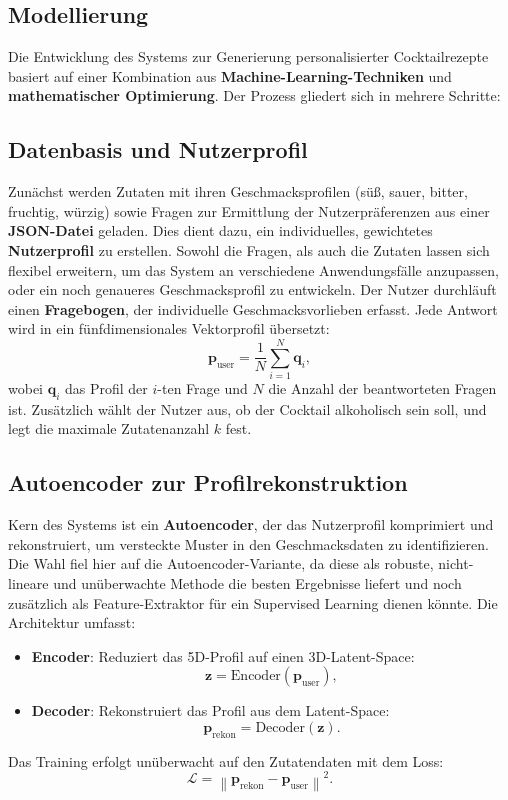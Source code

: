 \documentclass[12pt, a4paper]{report}
\begin{document}
\subsection{Modellierung}
Die Entwicklung des Systems zur Generierung personalisierter Cocktailrezepte basiert auf einer Kombination aus \textbf{Machine-Learning-Techniken} und \textbf{mathematischer Optimierung}. Der Prozess gliedert sich in mehrere Schritte:

\subsection*{Datenbasis und Nutzerprofil}
Zunächst werden Zutaten mit ihren Geschmacksprofilen (süß, sauer, bitter, fruchtig, würzig) sowie Fragen zur Ermittlung der Nutzerpräferenzen aus einer \textbf{JSON-Datei} geladen. Dies dient dazu, ein individuelles, gewichtetes \textbf{Nutzerprofil} zu erstellen. Sowohl die Fragen, als auch die Zutaten lassen sich flexibel erweitern, um das System an verschiedene Anwendungsfälle anzupassen, oder ein noch genaueres Geschmacksprofil zu entwickeln.
Der Nutzer durchläuft einen \textbf{Fragebogen}, der individuelle Geschmacksvorlieben erfasst. Jede Antwort wird in ein fünfdimensionales Vektorprofil übersetzt:
\[
\mathbf{p}_{\text{user}} = \frac{1}{N} \sum_{i=1}^N \mathbf{q}_i,
\]
wobei \( \mathbf{q}_i \) das Profil der \( i \)-ten Frage und \( N \) die Anzahl der beantworteten Fragen ist. Zusätzlich wählt der Nutzer aus, ob der Cocktail alkoholisch sein soll, und legt die maximale Zutatenanzahl \( k \) fest.

\subsection*{Autoencoder zur Profilrekonstruktion}
Kern des Systems ist ein \textbf{Autoencoder}, der das Nutzerprofil komprimiert und rekonstruiert, um versteckte Muster in den Geschmacksdaten zu identifizieren. Die Wahl fiel hier auf die Autoencoder-Variante, da diese als robuste, nicht-lineare und unüberwachte Methode die besten Ergebnisse liefert und noch zusätzlich als Feature-Extraktor für ein Supervised Learning dienen könnte.  Die Architektur umfasst:
\begin{itemize}
  \item \textbf{Encoder}: Reduziert das 5D-Profil auf einen 3D-Latent-Space:
    \[
    \mathbf{z} = \text{Encoder}(\mathbf{p}_{\text{user}}),
    \]
  \item \textbf{Decoder}: Rekonstruiert das Profil aus dem Latent-Space:
    \[
    \mathbf{p}_{\text{rekon}} = \text{Decoder}(\mathbf{z}).
    \]
\end{itemize}
Das Training erfolgt unüberwacht auf den Zutatendaten mit dem Loss:
\[
\mathcal{L} = \left\lVert \mathbf{p}_{\text{rekon}} - \mathbf{p}_{\text{user}} \right\rVert^2.
\]
\end{document}
